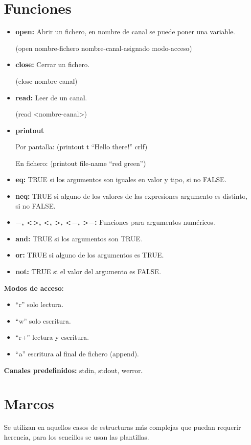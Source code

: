 \documentclass[12pt, twoside, openright]{report} %
\begin{document}
\section{Funciones}
\begin{itemize}
	\item \textbf{open:} Abrir un fichero, en nombre de canal se puede poner una variable.
	      
	      (open nombre-fichero nombre-canal-asignado modo-acceso)
	\item \textbf{close:} Cerrar un fichero.
	      
	      (close nombre-canal)
	\item \textbf{read:} Leer de un canal.
	      
	      (read <nombre-canal>)
	\item \textbf{printout}
	      
	      Por pantalla: (printout t “Hello there!” crlf)
	      
	      En fichero: (printout file-name “red green”)
	\item \textbf{eq:} TRUE si los argumentos son iguales en valor y tipo, si no FALSE.
	\item \textbf{neq:} TRUE si alguno de los valores de las expresiones argumento es distinto, si no FALSE.
	\item \textbf{=, <>, <, >, <=, >=:} Funciones para argumentos numéricos.
	\item \textbf{and:} TRUE si los argumentos son TRUE.
	\item \textbf{or:} TRUE si alguno de los argumentos es TRUE.
	\item \textbf{not:} TRUE si el valor del argumento es FALSE.
\end{itemize}

\textbf{Modos de acceso:}
\begin{itemize}
	\item “r” solo lectura.
	\item “w” solo escritura.
	\item “r+” lectura y escritura.
	\item “a” escritura al final de fichero (append).
\end{itemize}

\textbf{Canales predefinidos:} stdin, stdout, werror.
\section{Marcos}
Se utilizan en aquellos casos de estructuras más complejas que puedan requerir herencia, para los sencillos se usan las plantillas.
\end{document}
